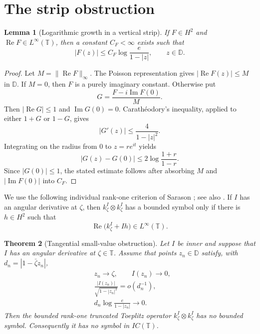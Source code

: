 \documentclass[11pt]{article}
\newtheorem{theorem}{Theorem}
\newtheorem{lemma}[theorem]{Lemma}
\newcommand{\D}{\mathbb D}
\newcommand{\T}{\mathbb T}
\begin{document}
\section{The strip obstruction}

\begin{lemma}[Logarithmic growth in a vertical strip]
\label{lem:strip}
If $F\in H^2$ and $\operatorname{Re}F\in L^\infty(\T)$, then a constant
$C_F<\infty$ exists such that
\[
 |F(z)|\le C_F\log\frac{e}{1-|z|},\qquad z\in\D.
\]
\end{lemma}

\begin{proof}
Let $M=\|\operatorname{Re}F\|_\infty$.  The Poisson representation gives
$|\operatorname{Re}F(z)|\le M$ in $\D$.  If $M=0$, then $F$ is a purely
imaginary constant.  Otherwise put
\[
 G=\frac{F-i\operatorname{Im}F(0)}{M}.
\]
Then $|\operatorname{Re}G|\le1$ and $\operatorname{Im}G(0)=0$.
Carath\'eodory's inequality, applied to either $1+G$ or $1-G$, gives
\[
 |G'(z)|\le \frac{4}{1-|z|^2}.
\]
Integrating on the radius from $0$ to $z=re^{it}$ yields
\[
 |G(z)-G(0)|\le 2\log\frac{1+r}{1-r}.
\]
Since $|G(0)|\le1$, the stated estimate follows after absorbing
$M$ and $|\operatorname{Im}F(0)|$ into $C_F$.
\end{proof}

We use the following individual rank-one criterion of Sarason
\cite[Section 5]{Sarason}; see also \cite[Remark 5.4]{BCFMT}.  If $I$ has an
angular derivative at $\zeta$, then $k_\zeta^I\otimes k_\zeta^I$ has a
bounded symbol only if there is $h\in H^2$ such that
\begin{equation}
 \operatorname{Re}\bigl(k_\zeta^I+Ih\bigr)\in L^\infty(\T).
 \label{eq:sarason}
\end{equation}

\begin{theorem}[Tangential small-value obstruction]
\label{thm:obstruction}
Let $I$ be inner and suppose that $I$ has an angular derivative at
$\zeta\in\T$.  Assume that points $z_n\in\D$ satisfy, with
$d_n=|1-\bar\zeta z_n|$,
\begin{align}
 &z_n\longrightarrow\zeta,\qquad I(z_n)\longrightarrow0,
 \label{eq:small1}\\
 &\frac{|I(z_n)|}{\sqrt{1-|z_n|^2}}=o(d_n^{-1}),
 \label{eq:small2}\\
 &d_n\log\frac{e}{1-|z_n|}\longrightarrow0.
 \label{eq:tangent}
\end{align}
Then the bounded rank-one truncated Toeplitz operator
$k_\zeta^I\otimes k_\zeta^I$ has no bounded symbol.  Consequently it has no
symbol in $I C(\T)$.
\end{theorem}
\end{document}
